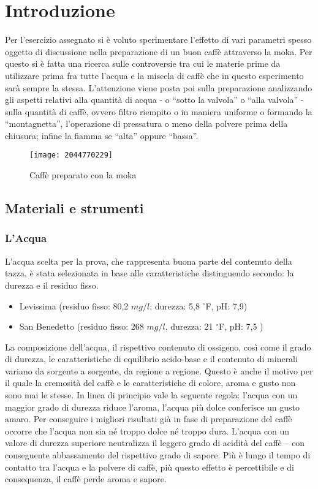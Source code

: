 \chapter{Introduzione}
Per l'esercizio assegnato si è voluto sperimentare l'effetto di vari parametri spesso oggetto di discussione nella preparazione di un buon caffè attraverso la moka.
Per questo si è fatta una ricerca sulle controversie tra cui le materie prime da utilizzare prima fra tutte l'acqua e la miscela di caffè che in questo esperimento sarà sempre la stessa. L'attenzione viene posta poi sulla preparazione analizzando gli aspetti relativi alla quantità di acqua - o “sotto la valvola” o “alla valvola” - sulla quantità di caffè, ovvero filtro riempito o in maniera uniforme o formando la “montagnetta”, l'operazione di pressatura o meno della polvere prima della chiusura; infine la fiamma se “alta” oppure “bassa”.
\begin{figure}[h]
  \centering
  \texttt{[image: 2044770229]}
  \caption{Caffè preparato con la moka}
  \label{fig:moka}
\end{figure}
\section{Materiali e strumenti}
\subsection{L'Acqua}
L'acqua scelta per la prova, che rappresenta buona parte del contenuto della tazza, è stata selezionata in base alle caratteristiche distinguendo secondo: la durezza e il residuo fisso.
\begin{itemize}
  \item Levissima (residuo fisso: 80,2 $mg/l$; durezza: 5,8 $^{\circ}$F, pH: 7,9)
  \item San Benedetto (residuo fisso: 268 $mg/l$, durezza: 21 $^{\circ}$F, pH: 7,5 )
\end{itemize}
La composizione dell’acqua, il rispettivo contenuto di ossigeno, così come il grado di durezza, le caratteristiche di equilibrio acido-base e il contenuto di minerali variano da sorgente a sorgente, da regione a regione. Questo è anche il motivo per il quale la cremosità del caffè e le caratteristiche di colore, aroma e gusto non sono mai le stesse.
In linea di principio vale la seguente regola: l’acqua con un maggior grado di durezza riduce l’aroma, l’acqua più dolce conferisce un gusto amaro.
Per conseguire i migliori risultati già in fase di preparazione del caffè occorre che l’acqua non sia né troppo dolce né troppo dura. L’acqua con un valore di durezza superiore neutralizza il leggero grado di acidità del caffè – con conseguente abbassamento del rispettivo grado di sapore. Più è lungo il tempo di contatto tra l'acqua e la polvere di caffè, più questo effetto è percettibile e di consequenza, il caffè perde aroma e sapore.


